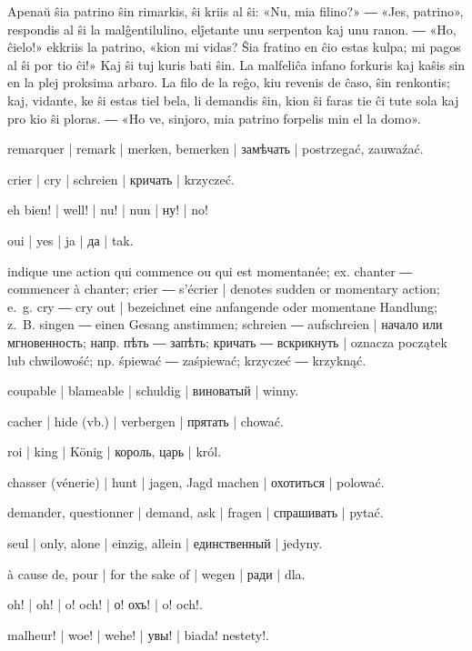 Apenaŭ ŝia patrino ŝin rimarkis, ŝi kriis al ŝi: «Nu, mia filino?» ― «Jes, patrino», respondis al ŝi la malĝentilulino, elĵetante unu serpenton kaj unu ranon. ― «Ho, ĉielo!» ekkriis la patrino, «kion mi vidas? Ŝia fratino en ĉio estas kulpa; mi pagos al ŝi por tio ĉi!» Kaj ŝi tuj kuris bati ŝin. La malfeliĉa infano forkuris kaj kaŝis sin en la plej proksima arbaro. La filo de la reĝo, kiu revenis de ĉaso, ŝin renkontis; kaj, vidante, ke ŝi estas tiel bela, li demandis ŝin, kion ŝi faras tie ĉi tute sola kaj pro kio ŝi ploras. ― «Ho ve, sinjoro, mia patrino forpelis min el la domo».

\begin{ekzvocab}{1em}
 remarquer | remark | merken, bemerken | замѣчать | postrzegać, zauwaźać.

 crier | cry | schreien | кричать | krzyczeć.

 eh bien! | well! | nu! | nun | ну! | no!

 oui | yes | ja | да | tak.

 indique une action qui commence ou qui est momentanée; ex.  chanter ―  commencer à chanter;  crier ―  s’écrier | denotes sudden or momentary action; e.~g.  cry ―  cry out | bezeichnet eine anfangende oder momentane Handlung; z.~B.  singen ―  einen Gesang anstimmen;  schreien ―  aufschreien | начало или мгновенность; напр.  пѣть ―  запѣть;  кричать ―  вскрикнуть | oznacza początek lub chwilowość; np.  śpiewać ―  zaśpiewać;  krzyczeć ―  krzyknąć.

 coupable | blameable | schuldig | виноватый | winny.

 cacher | hide (vb.) | verbergen | прятать | chować.

 roi | king | König | король, царь | król.

 chasser (vénerie) | hunt | jagen, Jagd machen | охотиться | polować.

 demander, questionner | demand, ask | fragen | спрашивать | pytać.

 seul | only, alone | einzig, allein | единственный | jedyny.

 à cause de, pour | for the sake of | wegen | ради | dla.

 oh! | oh! | o! och! | о! охъ! | o! och!.

 malheur! | woe! | wehe! | увы! | biada! nestety!.

\end{ekzvocab}

